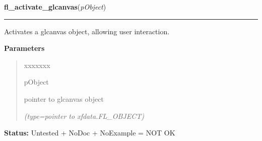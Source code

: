 \hspace{.8\funcindent}\begin{boxedminipage}{\funcwidth}

    \raggedright \textbf{fl\_activate\_glcanvas}(\textit{pObject})

    \vspace{-1.5ex}

    \rule{\textwidth}{0.5\fboxrule}
\setlength{\parskip}{2ex}
    Activates a glcanvas object, allowing user interaction.

\setlength{\parskip}{1ex}
      \textbf{Parameters}
      \vspace{-1ex}

      \begin{quote}
        \begin{Ventry}{xxxxxxx}

          \item[pObject]

          pointer to glcanvas object

            {\it (type=pointer to xfdata.FL\_OBJECT)}

        \end{Ventry}

      \end{quote}

\textbf{Status:} Untested + NoDoc + NoExample = NOT OK



    \end{boxedminipage}

    \label{xformslib:library:fl_get_glcanvas_xvisualinfo}

    \vspace{0.5ex}

